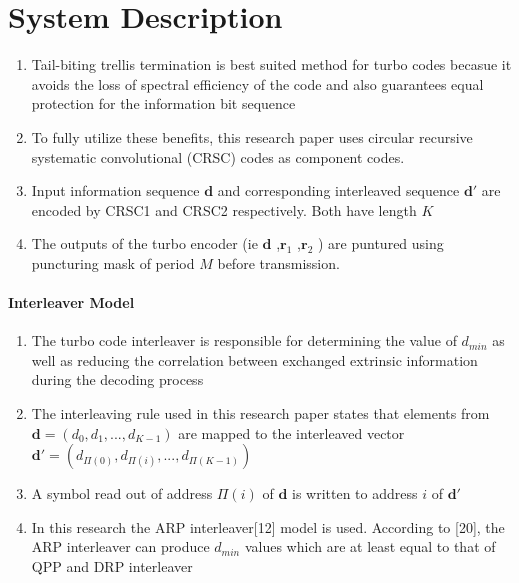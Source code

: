 \documentclass[fontsize=12pt]{article}
\begin{document}
\section{System Description}
\begin{enumerate}
\item Tail-biting trellis termination is best suited method for turbo codes becasue it avoids the loss of spectral efficiency of the code and also guarantees equal protection for the information bit sequence

\item To fully utilize these benefits, this research paper uses circular recursive systematic convolutional (CRSC) codes as component codes. 

\item  Input information sequence $\mathbf{d}$ and corresponding interleaved sequence $\mathbf{d}'$ are encoded by CRSC1 and CRSC2 respectively. Both have length $K$

\item The outputs of the turbo encoder (ie $\mathbf{d}$ ,$\mathbf{r}_1$ ,$\mathbf{r}_2$ ) are puntured using puncturing mask of period $M$ before transmission.

\end{enumerate}
\paragraph{Interleaver Model \newline}
\begin{enumerate}
\item The turbo code interleaver is responsible for determining the value of $d_{min}$ as well as reducing the correlation between exchanged extrinsic information during the decoding process

\item The interleaving rule used in this research paper states that elements from $\mathbf{d}=(d_0,d_1,...,d_{K-1} )$ are mapped to the interleaved vector $\mathbf{d}'=(d_{\Pi(0)},d_{\Pi(i)},...,d_{\Pi(K-1)} )$ 

\item A symbol read out of address $\Pi(i)$ of $\mathbf{d}$ is written to address $i$ of $\mathbf{d}'$

\item In this research the ARP interleaver[12] model is used. According to [20], the ARP interleaver can produce $d_{min}$ values which are at least equal to that of QPP and DRP interleaver 
\end{enumerate}
\end{document}
